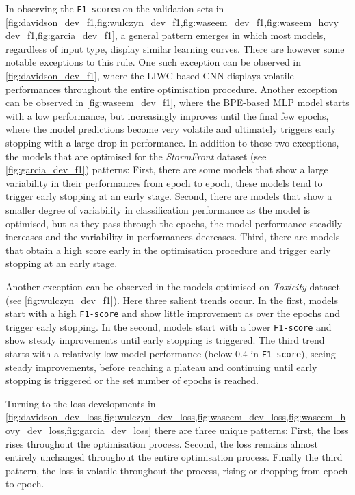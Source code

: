 In observing the \texttt{F1-score}s on the validation sets in \cref{fig:davidson_dev_f1,fig:wulczyn_dev_f1,fig:waseem_dev_f1,fig:waseem_hovy_dev_f1,fig:garcia_dev_f1}, a general pattern emerges in which most models, regardless of input type, display similar learning curves.  
There are however some notable exceptions to this rule.  
One such exception can be observed in \cref{fig:davidson_dev_f1}, where the LIWC-based CNN displays volatile performances throughout the entire optimisation procedure.  
Another exception can be observed in \cref{fig:waseem_dev_f1}, where the BPE-based MLP model starts with a low performance, but increasingly improves until the final few epochs, where the model predictions become very volatile and ultimately triggers early stopping with a large drop in performance.  
In addition to these two exceptions, the models that are optimised for the \textit{StormFront} dataset (see \cref{fig:garcia_dev_f1})  patterns:  
First, there are some models that show a large variability in their performances from epoch to epoch, these models tend to trigger early stopping at an early stage.  
Second, there are models that show a smaller degree of variability in classification performance as the model is optimised, but as they pass through the epochs, the model performance steadily increases and the variability in performances decreases.  
Third, there are models that obtain a high score early in the optimisation procedure and trigger early stopping at an early stage.  
  
Another exception can be observed in the models optimised on \textit{Toxicity} dataset (see \cref{fig:wulczyn_dev_f1}).  
Here three salient trends occur.  
In the first, models start with a high \texttt{F1-score} and show little improvement as over the epochs and trigger early stopping.  
In the second, models start with a lower \texttt{F1-score} and show steady improvements until early stopping is triggered.  
The third trend starts with a relatively low model performance (below $0.4$ in \texttt{F1-score}), seeing steady improvements, before reaching a plateau and continuing until early stopping is triggered or the set number of epochs is reached.  
  
Turning to the loss developments in \cref{fig:davidson_dev_loss,fig:wulczyn_dev_loss,fig:waseem_dev_loss,fig:waseem_hovy_dev_loss,fig:garcia_dev_loss} there are three unique patterns:   
First, the loss rises throughout the optimisation process.  
Second, the loss remains almost entirely unchanged throughout the entire optimisation process.   
Finally the third pattern, the loss is volatile throughout the process, rising or dropping from epoch to epoch.  
  
